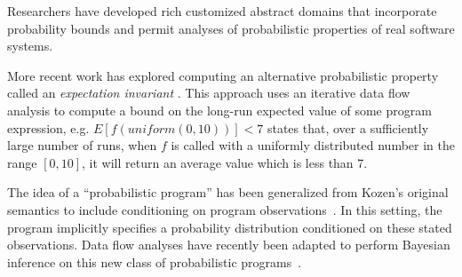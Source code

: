 Researchers have developed rich customized abstract domains that 
incorporate probability bounds \cite{mardziel2013dynamic,adje2014static}
and permit analyses of probabilistic properties of real software systems.

More recent work has explored computing an alternative probabilistic
property called an {\sl expectation invariant} \cite{chakarov2014expectation}.
This approach uses an iterative data flow analysis to 
compute a bound on the long-run expected value of
some program expression, e.g. $E[f(\mathit{uniform}(0,10))] < 7$ states that,
over a sufficiently large number of runs, when $f$ is called with
a uniformly distributed number in the range $[0,10]$, it will return
an average value which is less than 7.

The idea of a ``probabilistic program'' has been generalized from
Kozen's original semantics to include conditioning on program
observations~\cite{Gordon2014}.
In this setting, the program implicitly specifies a probability 
distribution conditioned on these stated observations.
Data flow analyses have recently been adapted to perform Bayesian
inference on this new class of probabilistic 
programs~\cite{claret2013bayesian}.  
